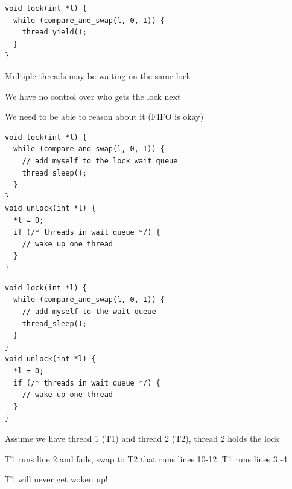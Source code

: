   \begin{slide}


    \begin{verbatim}
void lock(int *l) {
  while (compare_and_swap(l, 0, 1)) {
    thread_yield();
  }
}
    \end{verbatim}

    Multiple threads may be waiting on the same lock
    \medskip

    We have no control over who gets the lock next

    \leftspace{}We need to be able to reason about it (FIFO is okay)

  \end{slide}

  \begin{slide}


    \begin{verbatim}
void lock(int *l) {
  while (compare_and_swap(l, 0, 1)) {
    // add myself to the lock wait queue
    thread_sleep();
  }
}
void unlock(int *l) {
  *l = 0;
  if (/* threads in wait queue */) {
    // wake up one thread
  }
}
    \end{verbatim}
    \medskip

  \end{slide}

  \begin{slide}


	\vspace{-5mm}

    \begin{verbatim}
void lock(int *l) {
  while (compare_and_swap(l, 0, 1)) {
    // add myself to the wait queue
    thread_sleep();
  }
}
void unlock(int *l) {
  *l = 0;
  if (/* threads in wait queue */) {
    // wake up one thread
  }
}
    \end{verbatim}
    \medskip

    Assume we have thread 1 (T1) and thread 2 (T2), thread 2 holds the lock

    \leftspace{}T1 runs line 2 and fails, swap to T2 that runs lines 10-12, T1
    runs lines 3 -4

    \leftspace{}\leftspace{}T1 will never get woken up!
  \end{slide}

